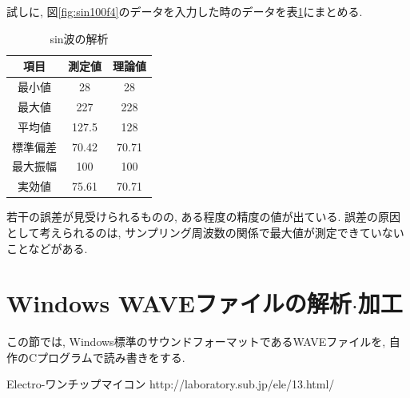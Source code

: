 \documentclass[titlepage]{jsarticle}
\begin{document}
        試しに, 図\ref{fig:sin100f4}のデータを入力した時のデータを表\ref{tab:stat}にまとめる.

        \begin{table}[ht]
            \centering
            \caption{sin波の解析}
            \label{tab:stat}
            \begin{tabular}{c|c|c}
                項目 & 測定値 & 理論値 \\ \hline \hline
                最小値 & 28 & 28 \\ \hline
                最大値 & 227 & 228 \\ \hline
                平均値 & 127.5 & 128 \\ \hline
                標準偏差 & 70.42 & 70.71 \\ \hline
                最大振幅 & 100 & 100 \\ \hline
                実効値 & 75.61 & 70.71
            \end{tabular}
        \end{table}

        若干の誤差が見受けられるものの, ある程度の精度の値が出ている.
        誤差の原因として考えられるのは, サンプリング周波数の関係で最大値が測定できていないことなどがある.

\section{Windows WAVEファイルの解析$\cdot$加工}
    この節では, Windows標準のサウンドフォーマットであるWAVEファイルを,
    自作のCプログラムで読み書きをする.

\begin{thebibliography}{99}
     Electro-ワンチップマイコン http://laboratory.sub.jp/ele/13.html/
\end{thebibliography}
\end{document}
